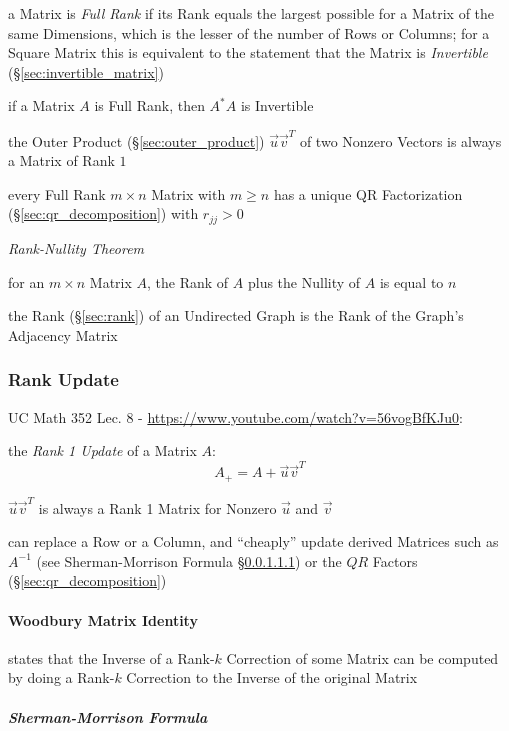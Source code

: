 a Matrix is \emph{Full Rank} if its Rank equals the largest possible for a
Matrix of the same Dimensions, which is the lesser of the number of Rows or
Columns; for a Square Matrix this is equivalent to the statement that the
Matrix is \emph{Invertible} (\S\ref{sec:invertible_matrix})

if a Matrix $A$ is Full Rank, then $A^*A$ is Invertible

the Outer Product (\S\ref{sec:outer_product}) $\vec{u}\vec{v}^T$ of two Nonzero
Vectors is always a Matrix of Rank $1$

every Full Rank $m \times n$ Matrix with $m \geq n$ has a unique QR
Factorization (\S\ref{sec:qr_decomposition}) with $r_{jj} > 0$

\emph{Rank-Nullity Theorem}

for an $m \times n$ Matrix $A$, the Rank of $A$ plus the Nullity of $A$ is
equal to $n$

\fist the Rank (\S\ref{sec:rank}) of an Undirected Graph is the Rank of the
Graph's Adjacency Matrix



\subsubsection{Rank Update}\label{sec:rank_update}

UC Math 352 Lec. 8 - \url{https://www.youtube.com/watch?v=56vogBfKJu0}:

the \emph{Rank 1 Update} of a Matrix $A$:
\[
  A_+ = A + \vec{u}\vec{v}^T
\]

$\vec{u}\vec{v}^T$ is always a Rank 1 Matrix for Nonzero $\vec{u}$ and
$\vec{v}$

can replace a Row or a Column, and ``cheaply'' update derived Matrices such as
$A^{-1}$ (see Sherman-Morrison Formula \S\ref{sec:sherman_morrison}) or the
$QR$ Factors (\S\ref{sec:qr_decomposition})



\paragraph{Woodbury Matrix Identity}\label{sec:woodbury_matrix_identity}\hfill

states that the Inverse of a Rank-$k$ Correction of some Matrix can be computed
by doing a Rank-$k$ Correction to the Inverse of the original Matrix



\subparagraph{Sherman-Morrison Formula}\label{sec:sherman_morrison}\hfill

